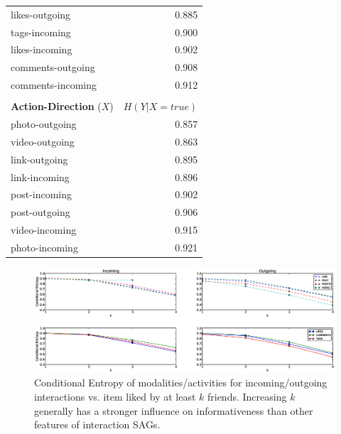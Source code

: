 \begin{table}
{\begin{tabular}{| >{\small}l | >{\small}r | }
		likes-outgoing & 0.885 \\
		tags-incoming & 0.900 \\
		likes-incoming & 0.902 \\
		comments-outgoing & 0.908 \\
		comments-incoming & 0.912 \\
		\hline
\multicolumn{2}{c}{}\\
                \hline	
		\textbf{Action-Direction} ($X$) & $H(Y|X=true)$ \\
		\hline
		photo-outgoing & 0.857 \\
		video-outgoing & 0.863 \\
		link-outgoing & 0.895 \\
		link-incoming & 0.896 \\
		post-incoming & 0.902 \\
		post-outgoing & 0.906 \\
		video-incoming & 0.915 \\
		photo-incoming & 0.921 \\
		\hline
				
	\end{tabular}}
\end{table}

\begin{figure}[tbp!]
\hspace{-15mm}\includegraphics[width=210mm]{data/plots/vsk/ModalityActionsvsKFriends.eps}
\vspace{-6mm}
\caption{Conditional Entropy  of modalities/activities for incoming/outgoing interactions vs. item liked by at least $k$ friends.  Increasing $k$ generally has a stronger influence on informativeness than other features of interaction SAGs.}
\label{Fig2}
\end{figure}

